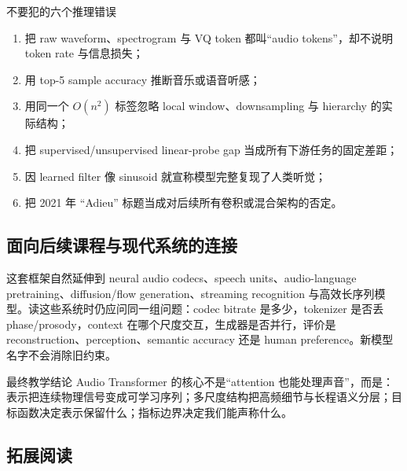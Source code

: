 \begin{warningbox}{不要犯的六个推理错误}
\begin{enumerate}
  \item 把 raw waveform、spectrogram 与 VQ token 都叫“audio tokens”，却不说明 token rate 与信息损失；
  \item 用 top-5 sample accuracy 推断音乐或语音听感；
  \item 用同一个 $O(n^2)$ 标签忽略 local window、downsampling 与 hierarchy 的实际结构；
  \item 把 supervised/unsupervised linear-probe gap 当成所有下游任务的固定差距；
  \item 因 learned filter 像 sinusoid 就宣称模型完整复现了人类听觉；
  \item 把 2021 年 “Adieu” 标题当成对后续所有卷积或混合架构的否定。
\end{enumerate}
\end{warningbox}

\subsection{面向后续课程与现代系统的连接}

这套框架自然延伸到 neural audio codecs、speech units、audio-language pretraining、diffusion/flow generation、streaming recognition 与高效长序列模型。读这些系统时仍应问同一组问题：codec bitrate 是多少，tokenizer 是否丢 phase/prosody，context 在哪个尺度交互，生成器是否并行，评价是 reconstruction、perception、semantic accuracy 还是 human preference。新模型名字不会消除旧约束。

\begin{importantbox}{最终教学结论}
Audio Transformer 的核心不是“attention 也能处理声音”，而是：表示把连续物理信号变成可学习序列；多尺度结构把高频细节与长程语义分层；目标函数决定表示保留什么；指标边界决定我们能声称什么。
\end{importantbox}

\subsection{拓展阅读}

